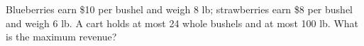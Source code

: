 Blueberries earn \$10 per bushel and weigh 8 lb; strawberries earn \$8 per bushel and weigh 6 lb. A cart holds at most 24 whole bushels and at most 100 lb. What is the maximum revenue?
